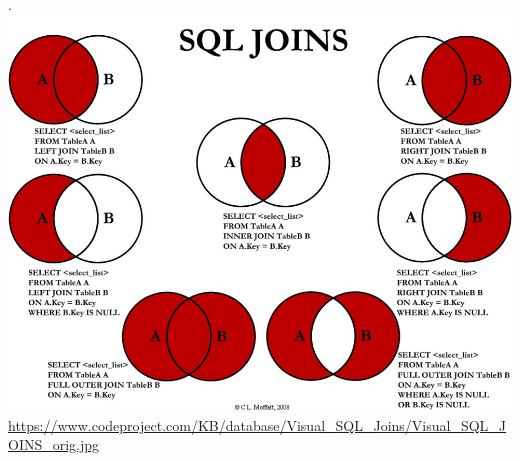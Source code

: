 \documentclass[aspectratio=169]{../latex_main/tntbeamer}  %
\begin{document}
	
	
	\begin{frame}{.}
	    \centering
	    \includegraphics[scale=.45]{Bild22}\\
	    {\small \url{https://www.codeproject.com/KB/database/Visual_SQL_Joins/Visual_SQL_JOINS_orig.jpg}}
	\end{frame}
\end{document}
